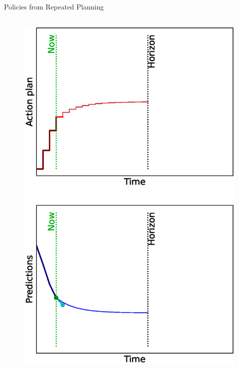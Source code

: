 \documentclass[lecture]{beamer}
\begin{document}
\begin{frame}{\normalsize Policies from Repeated Planning}
\begin{columns}
\begin{overlayarea}{\textwidth}{0.9\textheight}
\begin{figure}
{         \includegraphics[width=\FS\textwidth,clip]{Codes/MPC/MPC3.eps}
        }%
        {%
}
\end{figure}
\end{overlayarea}
\end{columns}
\end{frame}
\end{document}
